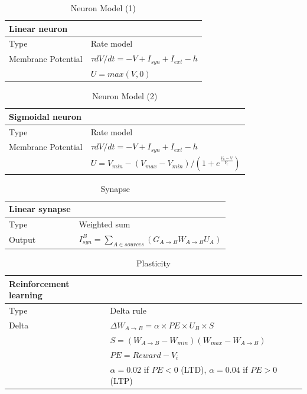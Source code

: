 \begin{table}[htbp]
\small \sffamily \centering
\begin{tabular}{ll}
\bf Linear neuron &\\
\hline
Type               & Rate model\\
Membrane Potential & \(\tau dV/dt = -V + I_{syn} + I_{ext} - h\)\\
                   & \(U = max(V,0)\)\\
\hline
\end{tabular}
\caption{Neuron Model (1)}
\end{table}



\begin{table}[htbp]
\small \sffamily \centering
\begin{tabular}{ll}
\bf Sigmoidal neuron &\\
\hline
Type & Rate model\\
Membrane Potential & \(\tau dV/dt = -V + I_{syn} + I_{ext} - h\)\\
&\(U = V_{min} - (V_{max}-V_{min}) / \left(1+e^{\frac{V_h - V}{V_c}}\right)\)\\
\hline
\end{tabular}
\caption{Neuron Model (2)}
\end{table}



\begin{table}[htbp]
\small\sffamily \centering
\begin{tabular}{ll}
\bf Linear synapse &\\
\hline
Type & Weighted sum\\
Output &
\(I^{B}_{syn} = \sum_{A \in sources}(G_{A \rightarrow B} W_{A \rightarrow B} U_{A})\)\\
\hline
\end{tabular}
\caption{Synapse}
\end{table}



\begin{table}[htbp]
\small \sffamily \centering
\begin{tabular}{ll}
\bf Reinforcement learning &\\
\hline
Type & Delta rule\\
Delta & \(\Delta W_{A \rightarrow B} = \alpha \times PE \times U_{B} \times S\)\\
      & \(S = (W_{A \rightarrow B}-W_{min})(W_{max} - W_{A \rightarrow B})\)\\
      & \(PE = Reward - V_{i}\)\\
      & \(\alpha = 0.02\) if \(PE < 0\) (LTD), \(\alpha = 0.04\) if \(PE > 0\) (LTP)\\
\hline
\end{tabular}
\caption{Plasticity}
\end{table}



